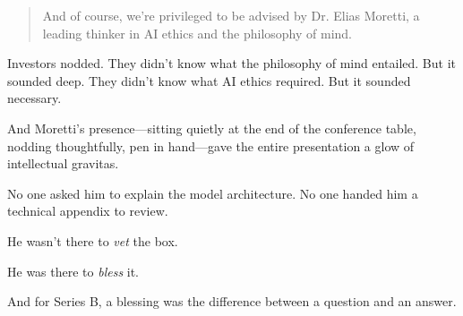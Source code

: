 \begin{quote}
And of course, we’re privileged to be advised by Dr. Elias Moretti, a leading thinker in AI ethics and the philosophy of mind.
\end{quote}

Investors nodded. They didn’t know what the philosophy of mind entailed. But it sounded deep.  
They didn’t know what AI ethics required. But it sounded necessary.

And Moretti’s presence—sitting quietly at the end of the conference table, nodding thoughtfully, pen in hand—gave the entire presentation a glow of intellectual gravitas.

No one asked him to explain the model architecture.  
No one handed him a technical appendix to review.

He wasn’t there to \textit{vet} the box.

He was there to \textit{bless} it.

And for Series B, a blessing was the difference between a question and an answer.



